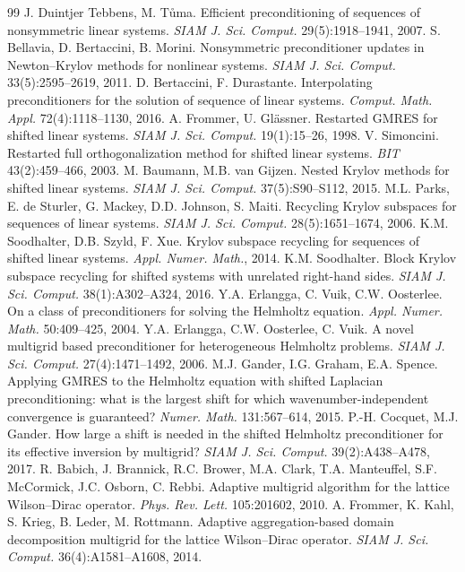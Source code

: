 \documentclass[11pt,a4paper]{article}
\begin{document}
\begin{thebibliography}{99}
 J. Duintjer Tebbens, M. T\r{u}ma. Efficient preconditioning of sequences of nonsymmetric linear systems. \emph{SIAM J. Sci. Comput.} 29(5):1918--1941, 2007.
 S. Bellavia, D. Bertaccini, B. Morini. Nonsymmetric preconditioner updates in Newton--Krylov methods for nonlinear systems. \emph{SIAM J. Sci. Comput.} 33(5):2595--2619, 2011.
 D. Bertaccini, F. Durastante. Interpolating preconditioners for the solution of sequence of linear systems. \emph{Comput. Math. Appl.} 72(4):1118--1130, 2016.
 A. Frommer, U. Gl\"assner. Restarted GMRES for shifted linear systems. \emph{SIAM J. Sci. Comput.} 19(1):15--26, 1998.
 V. Simoncini. Restarted full orthogonalization method for shifted linear systems. \emph{BIT} 43(2):459--466, 2003.
 M. Baumann, M.B. van Gijzen. Nested Krylov methods for shifted linear systems. \emph{SIAM J. Sci. Comput.} 37(5):S90--S112, 2015.
 M.L. Parks, E. de Sturler, G. Mackey, D.D. Johnson, S. Maiti. Recycling Krylov subspaces for sequences of linear systems. \emph{SIAM J. Sci. Comput.} 28(5):1651--1674, 2006.
 K.M. Soodhalter, D.B. Szyld, F. Xue. Krylov subspace recycling for sequences of shifted linear systems. \emph{Appl. Numer. Math.}, 2014.
 K.M. Soodhalter. Block Krylov subspace recycling for shifted systems with unrelated right-hand sides. \emph{SIAM J. Sci. Comput.} 38(1):A302--A324, 2016.
 Y.A. Erlangga, C. Vuik, C.W. Oosterlee. On a class of preconditioners for solving the Helmholtz equation. \emph{Appl. Numer. Math.} 50:409--425, 2004.
 Y.A. Erlangga, C.W. Oosterlee, C. Vuik. A novel multigrid based preconditioner for heterogeneous Helmholtz problems. \emph{SIAM J. Sci. Comput.} 27(4):1471--1492, 2006.
 M.J. Gander, I.G. Graham, E.A. Spence. Applying GMRES to the Helmholtz equation with shifted Laplacian preconditioning: what is the largest shift for which wavenumber-independent convergence is guaranteed? \emph{Numer. Math.} 131:567--614, 2015.
 P.-H. Cocquet, M.J. Gander. How large a shift is needed in the shifted Helmholtz preconditioner for its effective inversion by multigrid? \emph{SIAM J. Sci. Comput.} 39(2):A438--A478, 2017.
 R. Babich, J. Brannick, R.C. Brower, M.A. Clark, T.A. Manteuffel, S.F. McCormick, J.C. Osborn, C. Rebbi. Adaptive multigrid algorithm for the lattice Wilson--Dirac operator. \emph{Phys. Rev. Lett.} 105:201602, 2010.
 A. Frommer, K. Kahl, S. Krieg, B. Leder, M. Rottmann. Adaptive aggregation-based domain decomposition multigrid for the lattice Wilson--Dirac operator. \emph{SIAM J. Sci. Comput.} 36(4):A1581--A1608, 2014.

\end{thebibliography}
\end{document}
